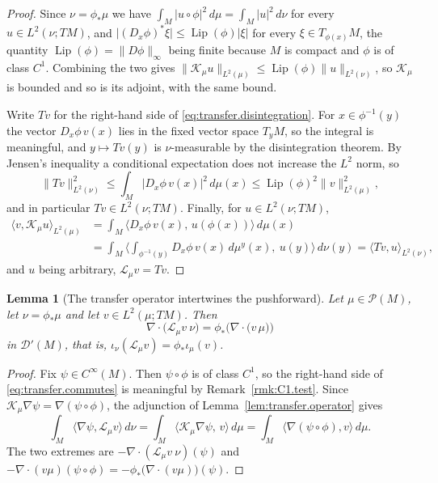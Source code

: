 \documentclass[11pt,reqno]{amsart}
\theoremstyle{plain}
\newtheorem{lem}[thm]{Lemma}
\theoremstyle{definition}
\newcommand{\Prob}{\mathcal{P}}
\newcommand{\Dist}{\mathcal{D}'}
\newcommand{\Koop}{\mathcal{K}}
\newcommand{\Transf}{\mathcal{L}}
\DeclareMathOperator{\Lip}{Lip}
\begin{document}
\begin{proof}
    Since \( \nu=\phi_\ast\mu \) we have \( \int_M\lvert u\circ\phi\rvert^2\,d\mu=\int_M\lvert u\rvert^2\,d\nu \) for every \( u\in L^2(\nu;TM) \), and \( \lvert(D_x\phi)^{\!\ast}\xi\rvert\le\Lip(\phi)\lvert\xi\rvert \) for every \( \xi\in T_{\phi(x)}M \), the quantity \( \Lip(\phi)=\lVert D\phi\rVert_\infty \) being finite because \( M \) is compact and \( \phi \) is of class \( C^1 \).
    Combining the two gives \( \lVert\Koop_\mu u\rVert_{L^2(\mu)}\le\Lip(\phi)\lVert u\rVert_{L^2(\nu)} \), so \( \Koop_\mu \) is bounded and so is its adjoint, with the same bound.

    Write \( Tv \) for the right-hand side of \eqref{eq:transfer.disintegration}.
    For \( x\in\phi^{-1}(y) \) the vector \( D_x\phi\,v(x) \) lies in the fixed vector space \( T_yM \), so the integral is meaningful, and \( y\mapsto Tv(y) \) is \( \nu \)-measurable by the disintegration theorem.
    By Jensen's inequality a conditional expectation does not increase the \( L^2 \) norm, so
    \[
        \lVert Tv\rVert^2_{L^2(\nu)}\le\int_M\lvert D_x\phi\,v(x)\rvert^2\,d\mu(x)\le\Lip(\phi)^2\lVert v\rVert^2_{L^2(\mu)},
    \]
    and in particular \( Tv\in L^2(\nu;TM) \).
    Finally, for \( u\in L^2(\nu;TM) \),
    \[
    \begin{split}
        \big\langle v,\Koop_\mu u\big\rangle_{L^2(\mu)}
        &=\int_M\big\langle D_x\phi\,v(x),\,u(\phi(x))\big\rangle\,d\mu(x)\\
        &=\int_M\Big\langle\int_{\phi^{-1}(y)}D_x\phi\,v(x)\,d\mu^y(x),\ u(y)\Big\rangle\,d\nu(y)
        =\big\langle Tv,u\big\rangle_{L^2(\nu)} ,
    \end{split}
    \]
    and \( u \) being arbitrary, \( \Transf_\mu v=Tv \).
\end{proof}

\begin{lem}[The transfer operator intertwines the pushforward]
\label{lem:transfer.intertwines}
    Let \( \mu\in\Prob(M) \), let \( \nu=\phi_\ast\mu \) and let \( v\in L^2(\mu;TM) \).
    Then
    \begin{equation}\label{eq:transfer.commutes}
        \nabla\!\cdot\big(\Transf_\mu v\ \nu\big)=\phi_\ast\Big(\nabla\!\cdot\big(v\,\mu\big)\Big)
    \end{equation}
    in \( \Dist(M) \), that is, \( \iota_\nu(\Transf_\mu v)=\phi_\ast\iota_\mu(v) \).
\end{lem}

\begin{proof}
    Fix \( \psi\in C^\infty(M) \).
    Then \( \psi\circ\phi \) is of class \( C^1 \), so the right-hand side of \eqref{eq:transfer.commutes} is meaningful by Remark~\ref{rmk:C1.test}.
    Since \( \Koop_\mu\nabla\psi=\nabla(\psi\circ\phi) \), the adjunction of Lemma~\ref{lem:transfer.operator} gives
    \[
        \int_M\big\langle\nabla\psi,\Transf_\mu v\big\rangle\,d\nu
        =\int_M\big\langle\Koop_\mu\nabla\psi,\,v\big\rangle\,d\mu
        =\int_M\big\langle\nabla(\psi\circ\phi),v\big\rangle\,d\mu .
    \]
    The two extremes are \( -\nabla\!\cdot(\Transf_\mu v\ \nu)(\psi) \) and \( -\nabla\!\cdot(v\mu)(\psi\circ\phi)=-\phi_\ast\big(\nabla\!\cdot(v\mu)\big)(\psi) \).
\end{proof}
\end{document}
